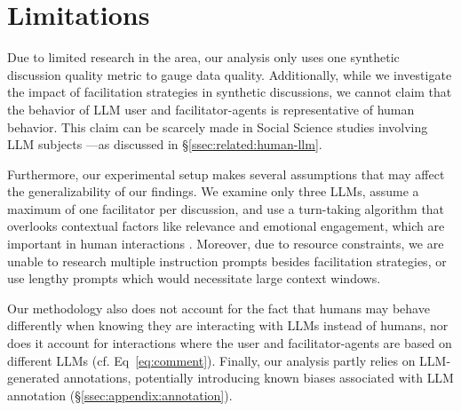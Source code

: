 %
\section{Limitations} 
\label{sec:limitations}

Due to limited research in the area, our analysis only uses one synthetic discussion quality metric to gauge data quality. Additionally, while we investigate the impact of facilitation strategies in synthetic discussions, we cannot claim that the behavior of \ac{LLM} user and facilitator-agents is representative of human behavior. This claim can be scarcely made in Social Science studies involving \ac{LLM} subjects \cite{rossi_2024, zhou-etal-2024-real}—as discussed in \S\ref{ssec:related:human-llm}.

Furthermore, our experimental setup makes several assumptions that may affect the generalizability of our findings. We examine only three \acp{LLM}, assume a maximum of one facilitator per discussion, and use a turn-taking algorithm that overlooks contextual factors like relevance and emotional engagement, which are important in human interactions \cite{robert_2016_comment, Ziegele03102018}. Moreover, due to resource constraints, we are unable to research multiple instruction prompts besides facilitation strategies, or use lengthy prompts which would necessitate large context windows. 

Our methodology also does not account for the fact that humans may behave differently when knowing they are interacting with \acp{LLM} instead of humans, nor  does it account for interactions where the user and facilitator-agents are based on different \acp{LLM} (cf. Eq~\ref{eq:comment}). Finally, our analysis partly relies on \ac{LLM}-generated annotations, potentially introducing known biases associated with \ac{LLM} annotation (\S\ref{ssec:appendix:annotation}).